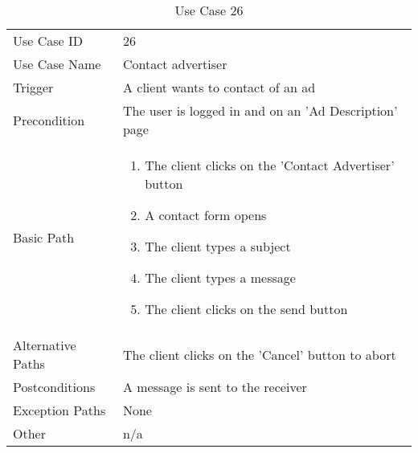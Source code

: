 \begin{table}[H]
\centering
\label{table-use-case-26}
\begin{tabular}{|p{3cm}|p{10cm}}
Use Case ID       & 26                                                           
\\
Use Case Name     & Contact advertiser                                                         
\\
Trigger           & A client wants to contact of an ad                                          
\\
Precondition      & The user is logged in and on an 'Ad Description' page                                                
\\
Basic Path        & \begin{enumerate}
\item The client clicks on the 'Contact Advertiser' button
\item A contact form opens
\item The client types a subject
\item The client types a message
\item The client clicks on the send button
\end{enumerate} 
     \\
Alternative Paths & The client clicks on the 'Cancel' button to abort                        
\\
Postconditions    & A message is sent to the receiver
\\
Exception Paths   & None                          \\
Other             & n/a                                                                                                                                                                                                        
\end{tabular}
\caption{Use Case 26}
\end{table}

